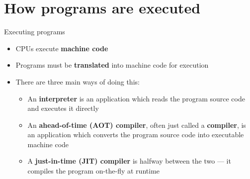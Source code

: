 \part{How programs are executed}
\frame{\partpage}

\begin{frame}{Executing programs}
    \begin{itemize}
        \item CPUs execute \textbf{machine code} \pause
        \item Programs must be \textbf{translated} into machine code for execution \pause
        \item There are three main ways of doing this: \pause
        \begin{itemize}
            \item An \textbf{interpreter} is an application which reads the program source code and executes it directly \pause
            \item An \textbf{ahead-of-time (AOT) compiler}, often just called a \textbf{compiler},
							is an application which converts the program source code into executable machine code \pause
            \item A \textbf{just-in-time (JIT) compiler} is halfway between the two --- it compiles the program on-the-fly
                at runtime
        \end{itemize}
    \end{itemize}
\end{frame}

